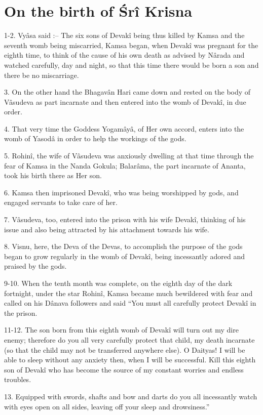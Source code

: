 ﻿\chapter{On the birth of \'Sr\^i Krisna}

1-2. Vy\^asa said :-- The six sons of Devak\^i being thus killed by Kamsa and the seventh womb being miscarried, Kamsa began, when Devak\^i was pregnant for the eighth time, to think of the cause of his own death as advised by N\^arada and watched carefully, day and night, so that this time there would be born a son and there be no miscarriage.

3. On the other hand the Bhagav\^an Hari came down and rested on the body of V\^asudeva as part incarnate and then entered into the womb of Devak\^i, in due order.

4. That very time the Goddess Yogam\^ay\^a, of Her own accord, enters into the womb of Yasod\^a in order to help the workings of the gods.

5. Rohin\^i, the wife of V\^asudeva was anxiously dwelling at that time through the fear of Kamsa in the Nanda Gokula; Balar\^ama, the part incarnate of Ananta, took his birth there as Her son.

6. Kamsa then imprisoned Devak\^i, who was being worshipped by gods, and engaged servants to take care of her.

7. V\^asudeva, too, entered into the prison with his wife Devak\^i, thinking of his issue and also being attracted by his attachment towards his wife.

8. Visnu, here, the Deva of the Devas, to accomplish the purpose of the gods began to grow regularly in the womb of Devak\^i, being incessantly adored and praised by the gods.

9-10. When the tenth month was complete, on the eighth day of the dark fortnight, under the star Rohin\^i, Kamsa became much bewildered with fear and called on his D\^anava followers and said ``You must all carefully protect Devak\^i in the prison.

11-12. The son born from this eighth womb of Devak\^i will turn out my dire enemy; therefore do you all very carefully protect that child, my death incarnate (so that the child may not be transferred anywhere else). O Daityas! I will be able to sleep without any anxiety then, when I will be successful. Kill this eighth son of Devak\^i who has become the source of my constant worries and endless troubles.

13. Equipped with swords, shafts and bow and darts do you all incessantly watch with eyes open on all sides, leaving off your sleep and drowsiness.''

